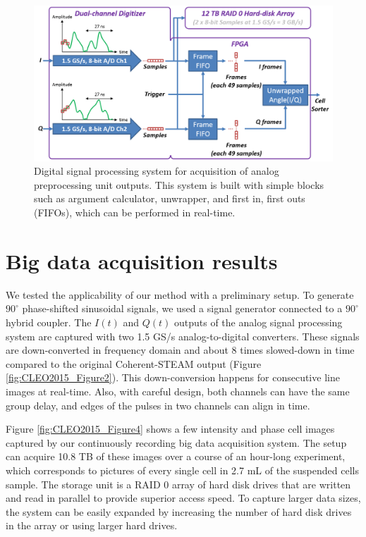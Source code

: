 \begin{figure}[htb!]
\centering
\includegraphics[scale=0.58]{CLEO2015/Figure3.png}
\caption{Digital signal processing system for acquisition of analog preprocessing unit outputs. This system is built with simple blocks such as argument calculator, unwrapper, and first in, first outs (FIFOs), which can be performed in real-time.}
\label{fig:CLEO2015_Figure3}
\end{figure}  

\section{Big data acquisition results}

We tested the applicability of our method with a preliminary setup. To generate $90^{\circ}$ phase-shifted sinusoidal signals, we used a signal generator connected to a $90^{\circ}$ hybrid coupler. The $I(t)$ and $Q(t)$ outputs of the analog signal processing system are captured with two 1.5 GS/s analog-to-digital converters. These signals are down-converted in frequency domain and about 8 times slowed-down in time compared to the original Coherent-STEAM output (Figure \ref{fig:CLEO2015_Figure2}). This down-conversion happens for consecutive line images at real-time. Also, with careful design, both channels can have the same group delay, and edges of the pulses in two channels can align in time. 

Figure \ref{fig:CLEO2015_Figure4} shows a few intensity and phase cell images captured by our continuously recording big data acquisition system. The setup can acquire 10.8 TB of these images over a course of an hour-long experiment, which corresponds to pictures of every single cell in 2.7 mL of the suspended cells sample. The storage unit is a RAID 0 array of hard disk drives that are written and read in parallel to provide superior access speed. To capture larger data sizes, the system can be easily expanded by increasing the number of hard disk drives in the array or using larger hard drives. 

